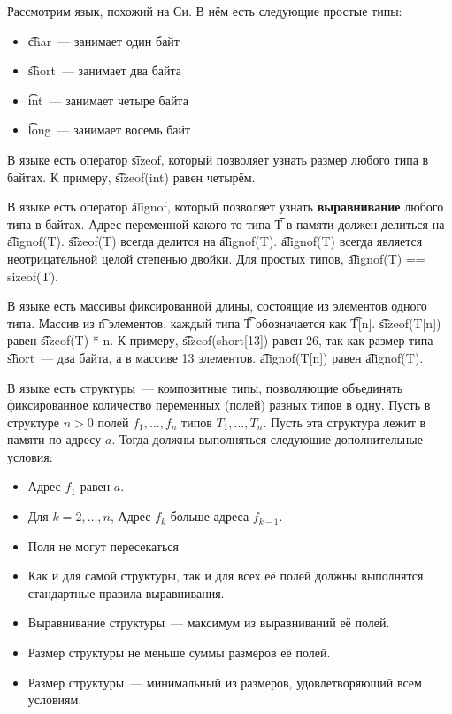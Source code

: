 Рассмотрим язык, похожий на Си. В нём есть следующие простые типы:

\begin{itemize}
 \item \t{char}~--- занимает один байт
 \item \t{short}~--- занимает два байта
 \item \t{int}~--- занимает четыре байта
 \item \t{long}~--- занимает восемь байт
\end{itemize}

В языке есть оператор \t{sizeof}, который позволяет узнать размер любого типа в байтах.
К примеру, \t{sizeof(int)} равен четырём.

В языке есть оператор \t{alignof}, который позволяет узнать {\bf выравнивание} любого типа в байтах.
Адрес переменной какого-то типа \t{T} в памяти должен делиться на \t{alignof(T)}.
\t{sizeof(T)} всегда делится на \t{alignof(T)}.
\t{alignof(T)} всегда является неотрицательной целой степенью двойки.
Для простых типов, \t{alignof(T) == sizeof(T)}. 

В языке есть массивы фиксированной длины, состоящие из элементов одного типа.
Массив из \t{n} элементов, каждый типа \t{T} обозначается как \t{T[n]}.
\t{sizeof(T[n])} равен \t{sizeof(T) * n}. К примеру, \t{sizeof(short[13])} равен 26,
так как размер типа \t{short}~--- два байта, а в массиве 13 элементов.
\t{alignof(T[n])} равен \t{alignof(T)}.

В языке есть структуры~--- композитные типы, позволяющие объединять фиксированное количество переменных (полей) разных типов в одну.
Пусть в структуре $n > 0$ полей $f_1, \ldots, f_n$ типов $T_1, \ldots, T_n$.
Пусть эта структура лежит в памяти по адресу $a$.
Тогда должны выполняться следующие дополнительные условия:

\begin{itemize}
 \item Адрес $f_1$ равен $a$.
 \item Для $k = 2, \ldots, n$, Адрес $f_k$ больше адреса $f_{k-1}$.
 \item Поля не могут пересекаться
 \item
Как и для самой структуры, так и для всех её полей должны выполнятся стандартные правила выравнивания.
 \item Выравнивание структуры~--- максимум из выравниваний её полей.
 \item Размер структуры не меньше суммы размеров её полей.
 \item Размер структуры~--- минимальный из размеров, удовлетворяющий всем условиям.
\end{itemize}

